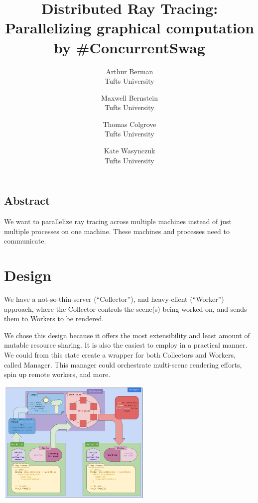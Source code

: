 \documentclass[letterpaper,twocolumn,10pt]{article}
\begin{document}
\date{}

\title{\Large \bf Distributed Ray Tracing: Parallelizing graphical computation\\
  \small \normalfont by \#ConcurrentSwag}

\newcommand{\tuftsauthor}[1]{{\rm #1}\\
  Tufts University}

\author{
  \tuftsauthor{Arthur Berman}
  \and
  \tuftsauthor{Maxwell Bernstein}
  \and
  \tuftsauthor{Thomas Colgrove}
  \and
  \tuftsauthor{Kate Wasynczuk}
}

\maketitle



\subsection*{Abstract}
We want to parallelize ray tracing across multiple machines instead of just
multiple processes on one machine. These machines and processes need to
communicate.

\section{Design}

We have a not-so-thin-server (``Collector''), and heavy-client (``Worker'')
approach, where the Collector controls the scene(s) being worked on, and sends
them to Workers to be rendered.

We chose this design because it offers the most extensibility and least amount
of mutable resource sharing. It is also the easiest to employ in a practical
manner. We could from this state create a wrapper for both Collectors and
Workers, called Manager. This manager could orchestrate multi-scene rendering
efforts, spin up remote workers, and more.\\ %

\begin{center}
  \includegraphics[height=60mm]{obj-diagram.png}
\end{center}
\end{document}
